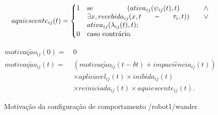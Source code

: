             \begin{equation}
                aquiescente_{ij}(t) =
                \begin{cases}
                    1 & \parbox[t]{.5\textwidth}{se $(ativa_{ij}(\psi_{ij}(t), t) \, 
                    \land \, \exists x, recebida_{ij}(x, t - \tau_i, t)) \, \lor \, ativa_{ij}(\lambda_{ij}(t), t)$;} \\
                    0 & \text{caso contrário.}
                \end{cases}
            \end{equation}
            
            \begin{equation}
                \begin{aligned}
                    motiva\textit{ç}\tilde{a}o_{ij}(0) = \ & 0 \\
                    motiva\textit{ç}\tilde{a}o_{ij}(t) = \ & (motiva\textit{ç}\tilde{a}o_{ij}(t - \delta t) + impaci\hat{e}ncia_{ij}(t)) \\
                    & \times aplic\acute{a}vel_{ij}(t) \times inibida_{ij}(t) \\
                    & \times reiniciada_{ij}(t) \times aquiescente_{ij}(t).
                \end{aligned}
            \end{equation}
            
            \datatable
            \begin{figure}[htb]
                \centering
                
                \caption{Motivação da configuração de comportamento /robot1/wander.} \label{fig:motivacao}
            \end{figure}